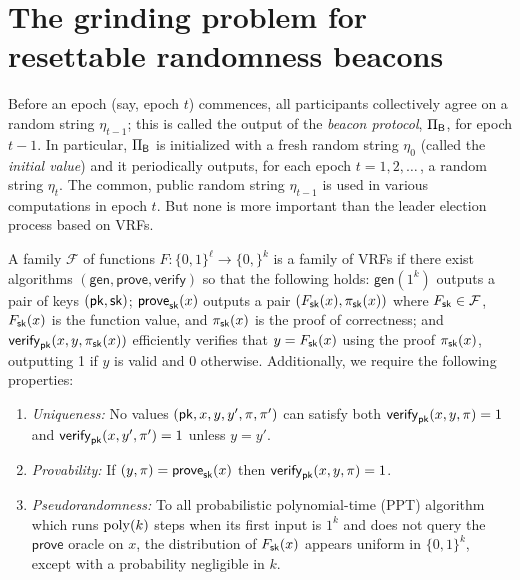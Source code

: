\section{The grinding problem for resettable randomness beacons}\label{beacon-model}
Before an epoch (say, epoch $t$) commences, 
all participants collectively agree on a random string $\eta_{t-1}$; 
this is called the output of the \emph{beacon protocol}, $\Pi_{\mathsf{B}}$, 
for epoch $t - 1$. 
In particular, $\Pi_{\mathsf{B}}$ is initialized with a fresh random string $\eta_0$ 
(called the \emph{initial value})
and it periodically outputs, for each epoch $t = 1, 2, \ldots$\,, 
a random string $\eta_t$. 
The common, public random string $\eta_{t-1}$ 
is used in various computations in epoch $t$. 
But none is more important than the leader election process 
based on VRFs.

\newcommand{\Gen}{\mathsf{gen}}
\newcommand{\Prove}{\mathsf{prove}}
\newcommand{\Verify}{\mathsf{verify}}
\begin{definition}\label{def:VRF}
  A family $\mathcal{F}$ 
  of functions $F : \{0,1\}^\ell \rightarrow \{0,\}^k$ 
  is a family of VRFs if there exist algorithms 
  $(\Gen, \Prove, \Verify)$ 
  so that the following holds: 
  $\Gen(1^k)$ outputs a pair of keys $(\mathsf{pk}, \mathsf{sk})$; 
  $\Prove_\sk(x)$ outputs a pair $(F_{\mathsf{sk}}(x), \pi_{\mathsf{sk}}(x))$ 
  where 
  $F_{\mathsf{sk}} \in \mathcal{F}$, $F_{\mathsf{sk}}(x)$ is the function value, and 
  $\pi_{\mathsf{sk}}(x)$ is the proof of correctness; and 
  $\Verify_\pk(x,y,\pi_\sk(x))$ efficiently verifies 
  that $y = F_{\mathsf{sk}}(x)$ using the proof $\pi_{\mathsf{sk}}(x)$, 
  outputting 1 if $y$ is valid and 0 otherwise. 
  Additionally, we require the following properties:

  \begin{enumerate}
    \item \emph{Uniqueness:} 
    No values $(\mathsf{pk}, x, y, y', \pi, \pi')$  can satisfy both 
    $\Verify_\pk(x,y,\pi) = 1$ and $\Verify_\pk(x,y',\pi') = 1$ 
    unless $y = y'$.

    \item \emph{Provability:} 
    If $(y, \pi) = \Prove_\sk(x)$ then $\Verify_\pk(x,y, \pi) = 1$.

    \item \emph{Pseudorandomness:} 
    To all probabilistic polynomial-time (PPT) algorithm 
    which runs $\mathrm{poly}(k)$ steps when its first input is $1^k$ 
    and does not query the $\Prove$ oracle on $x$, 
    the distribution of $F_{\mathsf{sk}}(x)$ appears uniform in $\{0,1\}^k$, 
    except with a probability negligible in $k$.
  \end{enumerate}

\end{definition}

